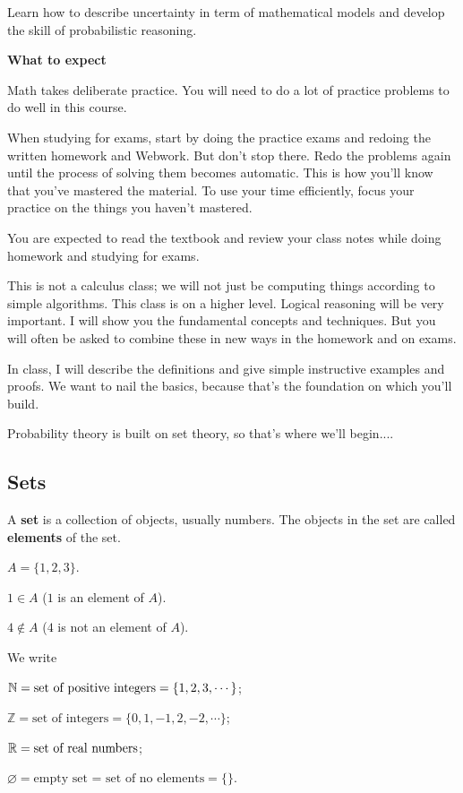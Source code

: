   Learn how to describe uncertainty in term of mathematical models and develop
  the skill of probabilistic reasoning.

  \textbf{What to expect}

  Math takes deliberate practice. You will need to do a lot of practice problems
  to do well in this course.
  
  When studying for exams, start by doing the practice exams and redoing the
  written homework and Webwork. But don't stop there. Redo the problems again
  until the process of solving them becomes automatic. This is how you'll know
  that you’ve mastered the material. To use your time efficiently, focus your
  practice on the things you haven't mastered.
  
  You are expected to read the textbook and review your class notes while doing homework and studying for exams.

  This is not a calculus class; we will not just be computing things according
  to simple algorithms. This class is on a higher level. Logical reasoning will
  be very important. I will show you the fundamental concepts and techniques.
  But you will often be asked to combine these in new ways in the homework and
  on exams.

  In class, I will describe the definitions and give simple instructive examples and proofs. We want to nail the basics, because that's the foundation on which you'll build.

  Probability theory is built on set theory, so that's where we'll begin....

  \subsection{Sets}
  \label{subsec:sets}
  \begin{definition}[Sets]
    A \textbf{set} is a collection of objects, usually numbers. The objects in
    the set are called \textbf{elements} of the set.
  \end{definition}

  \begin{example}
    $A = \{1, 2,3\}$.

    $1\in A$ ($1$ is an element of $A$).

    $4 \notin A$ ($4$ is not an element of $A$).
  \end{example}

  \begin{definition}
    We write

    $\mathbb{N} = \text{set of positive integers} = \{1, 2, 3,\cdots\}$;

    $\mathbb{Z} = \text{set of integers} = \{0, 1, -1, 2, -2,\cdots\}$;

    $\mathbb{R} = \text{set of real numbers}$;

    $\varnothing = \text{empty set = set of no elements} = \{\}$.
  \end{definition}

